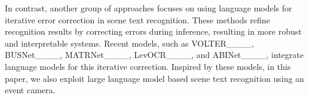 In contrast, another group of approaches focuses on using language models for iterative error correction in scene text recognition. These methods refine recognition results by correcting errors during inference, resulting in more robust and interpretable systems. Recent models, such as VOLTER____, BUSNet____, MATRNet____, LevOCR____, and ABINet____, integrate language models for this iterative correction. 
Inspired by these models, in this paper, we also exploit large language model based scene text recognition using an event camera. 





